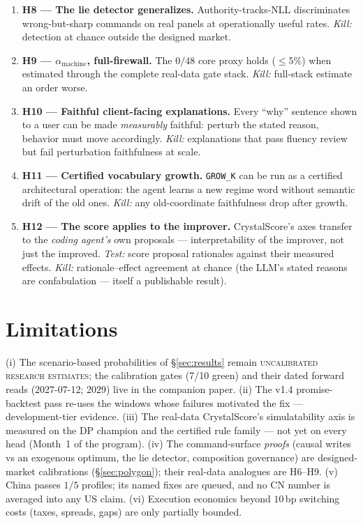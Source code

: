 \documentclass[11pt]{article}
\begin{document}
\begin{enumerate}
        overhead.
  \item \textbf{H8 --- The lie detector generalizes.} Authority-tracks-NLL discriminates
        wrong-but-sharp commands on real panels at operationally useful rates. \emph{Kill:}
        detection at chance outside the designed market.
  \item \textbf{H9 --- $\alpha_{\text{machine}}$, full-firewall.} The $0/48$ core proxy holds
        ($\le 5\%$) when estimated through the complete real-data gate stack. \emph{Kill:}
        full-stack estimate an order worse.
  \item \textbf{H10 --- Faithful client-facing explanations.} Every ``why'' sentence shown to
        a user can be made \emph{measurably} faithful: perturb the stated reason, behavior must
        move accordingly. \emph{Kill:} explanations that pass fluency review but fail
        perturbation faithfulness at scale.
  \item \textbf{H11 --- Certified vocabulary growth.} \texttt{GROW\_K} can be run as a
        certified architectural operation: the agent learns a new regime word without semantic
        drift of the old ones. \emph{Kill:} any old-coordinate faithfulness drop after growth.
  \item \textbf{H12 --- The score applies to the improver.} CrystalScore's axes transfer to the
        \emph{coding agent's} own proposals --- interpretability of the improver, not just the
        improved. \emph{Test:} score proposal rationales against their measured effects.
        \emph{Kill:} rationale--effect agreement at chance (the LLM's stated reasons are
        confabulation --- itself a publishable result).
\end{enumerate}

\section{Limitations}
\label{sec:limits}
(i) The scenario-based probabilities of \S\ref{sec:results} remain \textsc{uncalibrated
research estimates}; the calibration gates (7/10 green) and their dated forward reads
(2027-07-12; 2029) live in the companion paper. (ii) The v1.4 promise-backtest pass re-uses the
windows whose failures motivated the fix --- development-tier evidence. (iii) The real-data
CrystalScore's simulatability axis is measured on the DP champion and the certified rule family
--- not yet on every head (Month~1 of the program). (iv) The command-surface \emph{proofs}
(causal writes vs an exogenous optimum, the lie detector, composition governance) are
designed-market calibrations (\S\ref{sec:polygon}); their real-data analogues are H6--H9.
(v) China passes $1/5$ profiles; its named fixes are queued, and no CN number is averaged into
any US claim. (vi) Execution economics beyond $10$\,bp switching costs (taxes, spreads, gaps)
are only partially bounded.
\end{document}
